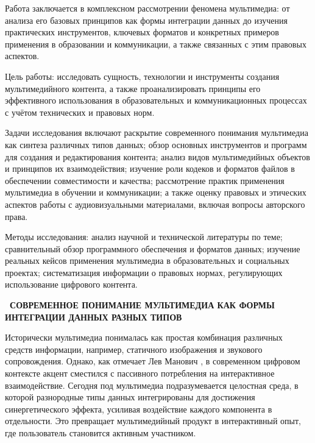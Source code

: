 \documentclass{SibFU-docs}
\begin{document}
Работа заключается в комплексном рассмотрении феномена мультимедиа: от анализа его базовых принципов как формы интеграции данных до изучения практических инструментов, ключевых форматов и конкретных примеров применения в образовании и коммуникации, а также связанных с этим правовых аспектов.

Цель работы: исследовать сущность, технологии и инструменты создания мультимедийного контента, а также проанализировать принципы его эффективного использования в образовательных и коммуникационных процессах с учётом технических и правовых норм.

Задачи исследования включают раскрытие современного понимания мультимедиа как синтеза различных типов данных; обзор основных инструментов и программ для создания и редактирования контента; анализ видов мультимедийных объектов и принципов их взаимодействия; изучение роли кодеков и форматов файлов в обеспечении совместимости и качества; рассмотрение практик применения мультимедиа в обучении и коммуникации; а также оценку правовых и этических аспектов работы с аудиовизуальными материалами, включая вопросы авторского права.

Методы исследования: анализ научной и технической литературы по теме; сравнительный обзор программного обеспечения и форматов данных; изучение реальных кейсов применения мультимедиа в образовательных и социальных проектах; систематизация информации о правовых нормах, регулирующих использование цифрового контента.

\newpage
\vspace*{-2.5em}
\begin{center}\textbf{\thesection\ СОВРЕМЕННОЕ ПОНИМАНИЕ МУЛЬТИМЕДИА КАК ФОРМЫ ИНТЕГРАЦИИ ДАННЫХ РАЗНЫХ ТИПОВ}\end{center}
\vspace*{-1.5em}

Исторически мультимедиа понималась как простая комбинация различных средств информации, например, статичного изображения и звукового сопровождения. Однако, как отмечает Лев Манович \cite{manovich2002}, в современном цифровом контексте акцент сместился с пассивного потребления на интерактивное взаимодействие. Сегодня под мультимедиа подразумевается целостная среда, в которой разнородные типы данных интегрированы для достижения синергетического эффекта, усиливая воздействие каждого компонента в отдельности. Это превращает мультимедийный продукт в интерактивный опыт, где пользователь становится активным участником.
\end{document}
